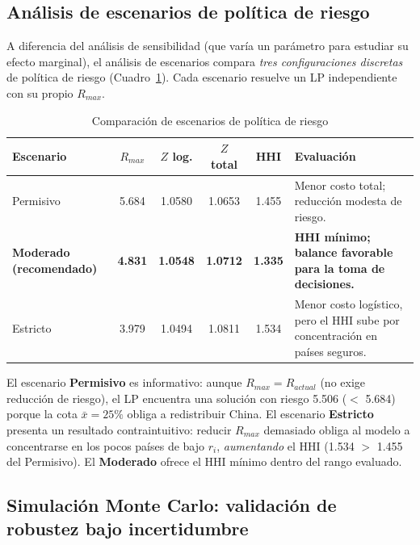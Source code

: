 \documentclass[11pt,a4paper]{article}
\begin{document}
\subsection{Análisis de escenarios de política de riesgo}
\label{sec:escenarios_pol}

A diferencia del análisis de sensibilidad (que varía un parámetro para estudiar su efecto marginal), el análisis de escenarios compara \emph{tres configuraciones discretas} de política de riesgo (Cuadro~\ref{tab:escenarios}). Cada escenario resuelve un LP independiente con su propio $R_{max}$.

\begin{table}[H]
\centering
\caption{Comparación de escenarios de política de riesgo}
\label{tab:escenarios}
\footnotesize
\begin{tabularx}{\textwidth}{lccccX} 
\toprule
\textbf{Escenario} & \textbf{$R_{max}$} & \textbf{$Z$ log.} & \textbf{$Z$ total} & \textbf{HHI} & \textbf{Evaluación} \\
\midrule
Permisivo & 5.684 & 1.0580 & 1.0653 & 1.455 & Menor costo total; reducción modesta de riesgo. \\
\rowcolor{verdesuave}
\textbf{Moderado (recomendado)} & \textbf{4.831} & \textbf{1.0548} & \textbf{1.0712} & \textbf{1.335} & \textbf{HHI mínimo; balance favorable para la toma de decisiones.} \\
Estricto & 3.979 & 1.0494 & 1.0811 & 1.534 & Menor costo logístico, pero el HHI sube por concentración en países seguros. \\
\bottomrule
\end{tabularx}
\end{table}

\vspace{-0.2cm}
El escenario \textbf{Permisivo} es informativo: aunque $R_{max} = R_{actual}$ (no exige reducción de riesgo), el LP encuentra una solución con riesgo 5.506 ($<$ 5.684) porque la cota $\bar{x}=25\%$ obliga a redistribuir China. El escenario \textbf{Estricto} presenta un resultado contraintuitivo: reducir $R_{max}$ demasiado obliga al modelo a concentrarse en los pocos países de bajo $r_i$, \emph{aumentando} el HHI (1.534 $>$ 1.455 del Permisivo). El \textbf{Moderado} ofrece el HHI mínimo dentro del rango evaluado.

\subsection{Simulación Monte Carlo: validación de robustez bajo incertidumbre}
\end{document}

